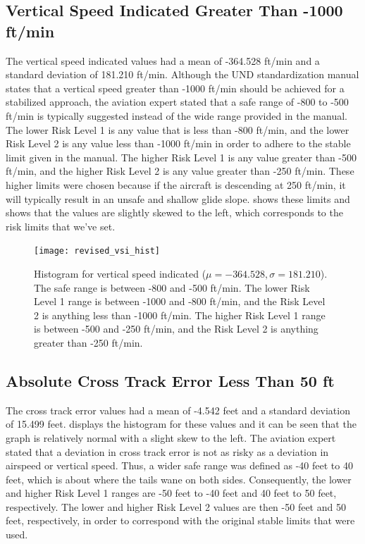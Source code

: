     \subsection{Vertical Speed Indicated Greater Than -1000 ft/min}
    
    	The vertical speed indicated values had a mean of -364.528 ft/min and a standard deviation of 181.210 ft/min.  Although the UND standardization manual states that a vertical speed greater than -1000 ft/min should be achieved for a stabilized approach, the aviation expert stated that a safe range of -800 to -500 ft/min is typically suggested instead of the wide range provided in the manual.  The lower Risk Level 1 is any value that is less than -800 ft/min, and the lower Risk Level 2 is any value less than -1000 ft/min in order to adhere to the stable limit given in the manual.  The higher Risk Level 1 is any value greater than -500 ft/min, and the higher Risk Level 2 is any value greater than -250 ft/min.  These higher limits were chosen because if the aircraft is descending at 250 ft/min, it will typically result in an unsafe and shallow glide slope.   shows these limits and shows that the values are slightly skewed to the left, which corresponds to the risk limits that we've set.

		\begin{figure}[t]
			\centering
            \texttt{[image: revised\_vsi\_hist]}
            \caption{Histogram for vertical speed indicated ($\mu = -364.528, \sigma = 181.210$).  The safe range is between -800 and -500 ft/min.  The lower Risk Level 1 range is between -1000 and -800 ft/min, and the Risk Level 2 is anything less than -1000 ft/min.  The higher Risk Level 1 range is between -500 and -250 ft/min, and the Risk Level 2 is anything greater than -250 ft/min.}
            \label{fig:revised_vsi_hist}
		\end{figure}



    \subsection{Absolute Cross Track Error Less Than 50 ft}
    
    	The cross track error values had a mean of -4.542 feet and a standard deviation of 15.499 feet.   displays the histogram for these values and it can be seen that the graph is relatively normal with a slight skew to the left.  The aviation expert stated that a deviation in cross track error is not as risky as a deviation in airspeed or vertical speed.  Thus, a wider safe range was defined as -40 feet to 40 feet, which is about where the tails wane on both sides.  Consequently, the lower and higher Risk Level 1 ranges are -50 feet to -40 feet and 40 feet to 50 feet, respectively.  The lower and higher Risk Level 2 values are then -50 feet and 50 feet, respectively, in order to correspond with the original stable limits that were used.
        
